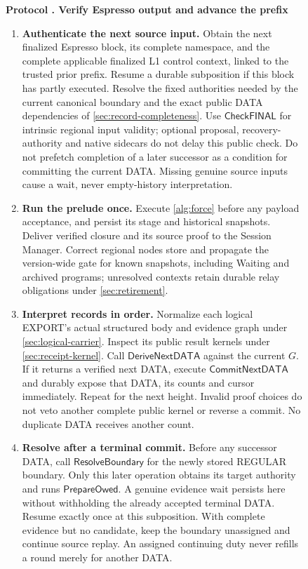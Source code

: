 \documentclass[11pt,a4paper]{article}
\newcommand{\tagg}[1]{\ensuremath{\mathsf{#1}}}
\newcounter{protocol}
\newenvironment{protocol}[3][htbp]{\begin{figure}[#1]\refstepcounter{protocol}\label{#2}
\begin{mdframed}[linewidth=.6pt,skipabove=0pt,skipbelow=0pt,
innertopmargin=7pt,innerbottommargin=7pt]\small
\textbf{Protocol \theprotocol. #3}\par\smallskip}{\end{mdframed}\end{figure}}
\begin{document}
\begin{protocol}{alg:external}{Verify Espresso output and advance the prefix}
\begin{enumerate}[label=\textbf{\arabic*)},itemsep=3pt]
\item \textbf{Authenticate the next source input.} Obtain the next
finalized Espresso block, its complete namespace, and the complete
applicable finalized L1 control context, linked to the trusted prior
prefix. Resume a durable subposition if this block has partly executed.
Resolve the fixed authorities needed by the current canonical boundary
and the exact public DATA dependencies of \cref{sec:record-completeness}.
Use \tagg{CheckFINAL} for intrinsic regional input validity; optional
proposal, recovery-authority and native sidecars do not delay this
public check. Do not prefetch completion of a later successor as a
condition for committing the current DATA. Missing genuine source
inputs cause a wait, never empty-history interpretation.

\item \textbf{Run the prelude once.} Execute \cref{alg:force} before
any payload acceptance, and persist its stage and historical snapshots.
Deliver verified closure and its source proof to the Session Manager.
Correct regional nodes store and propagate the version-wide gate for
known snapshots, including Waiting and archived programs; unresolved
contexts retain durable relay obligations under \cref{sec:retirement}.

\item \textbf{Interpret records in order.} Normalize each logical EXPORT's
actual structured body and evidence graph under \cref{sec:logical-carrier}.
Inspect its public result kernels under \cref{sec:receipt-kernel}. Call
$\tagg{DeriveNextDATA}$ against the current $G$. If it returns a verified
next DATA, execute $\tagg{CommitNextDATA}$ and durably expose that DATA,
its counts and cursor immediately. Repeat for the next height. Invalid
proof choices do not veto another complete public kernel or reverse a commit.
No duplicate DATA receives another count.

\item \textbf{Resolve after a terminal commit.} Before any successor
DATA, call $\tagg{ResolveBoundary}$ for the newly stored REGULAR
boundary. Only this later operation obtains its target authority and
runs $\tagg{PrepareOwed}$. A genuine evidence wait persists here without
withholding the already accepted terminal DATA. Resume exactly once at
this subposition. With complete evidence but no candidate, keep the
boundary unassigned and continue source replay. An assigned continuing
duty never refills a round merely for another DATA.


\end{enumerate}
\end{protocol}
\end{document}
